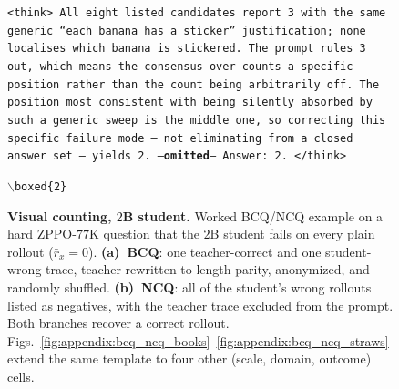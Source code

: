 \begin{figure}[!p]
\begin{prompttemplatefig}
\smallskip
\texttt{<think> All eight listed candidates report 3 with the same generic ``each banana has a sticker'' justification; none localises which banana is stickered. The prompt rules 3 out, which means the consensus over-counts a specific position rather than the count being arbitrarily off. The position most consistent with being silently absorbed by such a generic sweep is the middle one, so correcting this specific failure mode -- not eliminating from a closed answer set -- yields 2. ---\textbf{omitted}--- Answer: 2. </think>}

\smallskip
\texttt{$\backslash$boxed\{2\}} \quad \textcolor{posgain}{\checkmark}
\end{prompttemplatefig}

\caption{\textbf{Visual counting, $2$B student.} Worked BCQ/NCQ example on a hard ZPPO-$77$K question that the $2$B student fails on every plain rollout ($\bar{r}_x\!=\!0$). \textbf{(a)~BCQ}: one teacher-correct and one student-wrong trace, teacher-rewritten to length parity, anonymized, and randomly shuffled. \textbf{(b)~NCQ}: all of the student's wrong rollouts listed as negatives, with the teacher trace excluded from the prompt. Both branches recover a correct rollout. Figs.~\ref{fig:appendix:bcq_ncq_books}--\ref{fig:appendix:bcq_ncq_straws} extend the same template to four other (scale, domain, outcome) cells.}
\label{fig:appendix:bcq_ncq_qualitative}
\end{figure}
